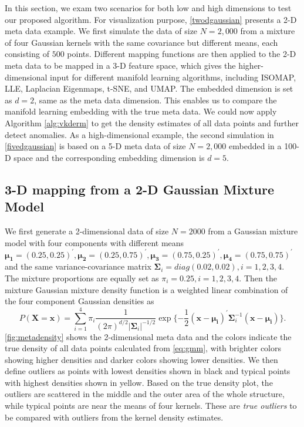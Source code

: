 \documentclass[11pt,a4paper,]{article}
\begin{document}
In this section, we exam two scenarios for both low and high dimensions to test our proposed algorithm. For visualization purpose, \autoref{twodgaussian} presents a 2-D meta data example. We first simulate the data of size \(N=2,000\) from a mixture of four Gaussian kernels with the same covariance but different means, each consisting of \(500\) points. Different mapping functions are then applied to the 2-D meta data to be mapped in a 3-D feature space, which gives the higher-dimensional input for different manifold learning algorithms, including ISOMAP, LLE, Laplacian Eigenmaps, t-SNE, and UMAP. The embedded dimension is set as \(d=2\), same as the meta data dimension. This enables us to compare the manifold learning embedding with the true meta data. We could now apply Algorithm \ref{alg:vkderm} to get the density estimates of all data points and further detect anomalies. As a high-dimensional example, the second simulation in \autoref{fivedgaussian} is based on a 5-D meta data of size \(N=2,000\) embedded in a 100-D space and the corresponding embedding dimension is \(d=5\).

\hypertarget{twodgaussian}{%
\subsection{3-D mapping from a 2-D Gaussian Mixture Model}\label{twodgaussian}}

We first generate a 2-dimensional data of size \(N=2000\) from a Gaussian mixture model with four components with different means \(\pmb{\mu_1}=(0.25, 0.25)^\prime, \pmb{\mu_2}=(0.25, 0.75)^\prime, \pmb{\mu_3}=(0.75, 0.25)^\prime, \pmb{\mu_4}=(0.75, 0.75)^\prime\) and the same variance-covariance matrix \(\pmb{\Sigma}_i=diag(0.02, 0.02), i=1,2,3,4\). The mixture proportions are equally set as \(\pi_i=0.25, i=1,2,3,4\).
Then the mixture Gaussian mixture density function is a weighted linear combination of the four component Gaussian densities as
\begin{equation}
\label{eq:gmm}
P(\pmb{X}=\pmb{x}) = \sum_{i=1}^{4}\pi_i \frac{1}{(2\pi)^{d/2}|\pmb{\Sigma}_i|^{-1/2}} \exp{\{-\frac{1}{2} (\pmb{x}-\pmb{\mu_i})^\prime \pmb{\Sigma}_i^{-1} (\pmb{x}-\pmb{\mu_i}) \}}.
\end{equation}
\autoref{fig:metadensity} shows the 2-dimensional meta data and the colors indicate the true density of all data points calculated from \eqref{eq:gmm}, with brighter colors showing higher densities and darker colors showing lower densities. We then define outliers as points with lowest densities shown in black and typical points with highest densities shown in yellow. Based on the true density plot, the outliers are scattered in the middle and the outer area of the whole structure, while typical points are near the means of four kernels. These are \emph{true outliers} to be compared with outliers from the kernel density estimates.
\end{document}
